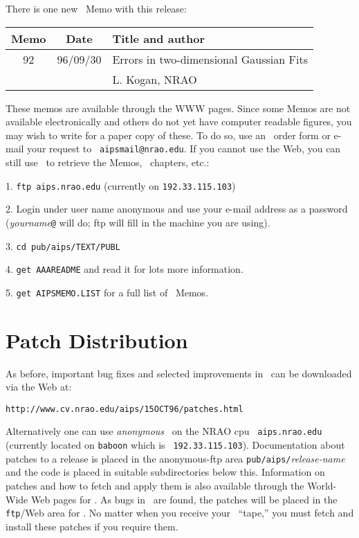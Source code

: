There is one new \AIPS\ Memo with this release:
\begin{center}
\vspace{-6pt}
\begin{tabular}{ccl}
\hline
Memo  &        Date   & Title and author  \\
\hline\hline
  92 & 96/09/30 & Errors in two-dimensional Gaussian Fits \\
     &          & \qquad L. Kogan, NRAO \\
\hline
\end{tabular}
\end{center}
\vspace{-6pt}
These memos are available through the WWW pages.  Since some Memos
are not available electronically and others do not yet have computer
readable figures, you may wish to write for a paper copy of these.  To
do so, use an \AIPS\ order form or e-mail your request to {\tt
aipsmail@nrao.edu}.  If you cannot use the Web, you can still use
\ftp\ to retrieve the Memos, \Cookbook\ chapters, etc.:
\begin{description}
\vspace{-10pt}
\item{ 1.} {\tt ftp aips.nrao.edu}  (currently on {\tt 192.33.115.103})
\item{ 2.} Login under user name anonymous and use your e-mail address
           as a password ({\it yourname}{\tt @} will do; ftp will
           fill in the machine you are using).
\item{ 3.} {\tt cd pub/aips/TEXT/PUBL}
\item{ 4.} {\tt get AAAREADME} and read it for lots more information.
\item{ 5.} {\tt get AIPSMEMO.LIST} for a full list of \AIPS\ Memos.
\end{description}

\section{Patch Distribution}

As before, important bug fixes and selected improvements in
\RELEASENAME\ can be downloaded via the Web at:

\begin{center}
\vskip -10pt
{\tt http://www.cv.nrao.edu/aips/15OCT96/patches.html}
\vskip -10pt
\end{center}

Alternatively one can use {\it anonymous} \ftp\ on the NRAO cpu {\tt
aips.nrao.edu} (currently located on {\tt baboon} which is {\tt
192.33.115.103}).  Documentation about patches to a release is placed
in the anonymous-ftp area {\tt pub/aips/}{\it release-name} and the
code is placed in suitable subdirectories below this. Information on
patches and how to fetch and apply them is also available through the
World-Wide Web pages for \hbox{\AIPS}.  As bugs in \RELEASENAME\ are
found, the patches will be placed in the {\tt ftp}/Web area for
\hbox{{\RELEASENAME}}.  No matter when you receive your \RELEASENAME\
``tape,'' you must fetch and install these patches if you require
them.

